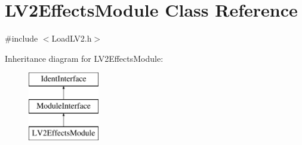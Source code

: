 \hypertarget{class_l_v2_effects_module}{}\section{L\+V2\+Effects\+Module Class Reference}
\label{class_l_v2_effects_module}


{\ttfamily \#include $<$Load\+L\+V2.\+h$>$}

Inheritance diagram for L\+V2\+Effects\+Module\+:\begin{figure}[H]
\begin{center}
\leavevmode
\includegraphics[height=3.000000cm]{class_l_v2_effects_module}
\end{center}
\end{figure}
